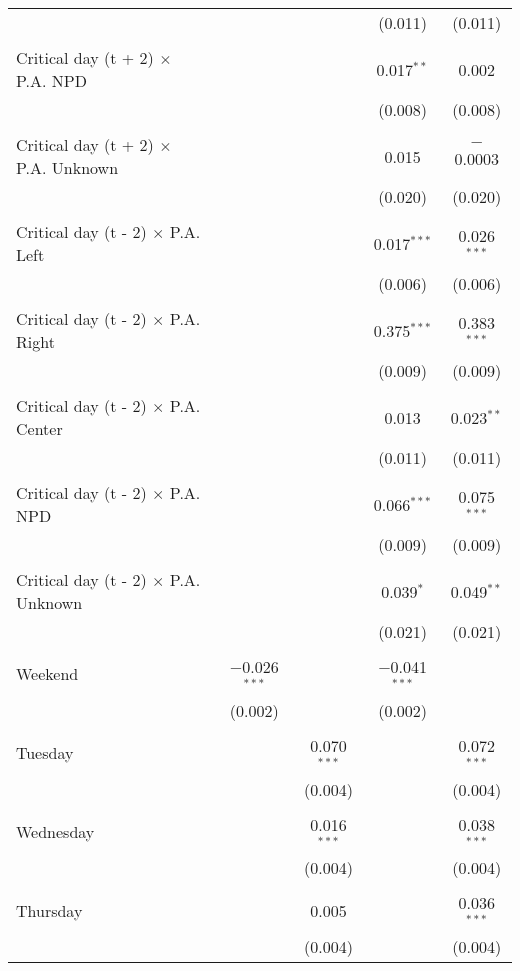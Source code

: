 \documentclass[
]{article}
\begin{document}
\begin{table}[!htbp]
{\begin{tabular}{@{\extracolsep{5pt}}lcccc}
  &  &  & (0.011) & (0.011) \\ 
  & & & & \\ 
 Critical day (t + 2) $\times$ P.A. NPD &  &  & 0.017$^{**}$ & 0.002 \\ 
  &  &  & (0.008) & (0.008) \\ 
  & & & & \\ 
 Critical day (t + 2) $\times$ P.A. Unknown &  &  & 0.015 & $-$0.0003 \\ 
  &  &  & (0.020) & (0.020) \\ 
  & & & & \\ 
 Critical day (t - 2) $\times$ P.A. Left &  &  & 0.017$^{***}$ & 0.026$^{***}$ \\ 
  &  &  & (0.006) & (0.006) \\ 
  & & & & \\ 
 Critical day (t - 2) $\times$ P.A. Right &  &  & 0.375$^{***}$ & 0.383$^{***}$ \\ 
  &  &  & (0.009) & (0.009) \\ 
  & & & & \\ 
 Critical day (t - 2) $\times$ P.A. Center &  &  & 0.013 & 0.023$^{**}$ \\ 
  &  &  & (0.011) & (0.011) \\ 
  & & & & \\ 
 Critical day (t - 2) $\times$ P.A. NPD &  &  & 0.066$^{***}$ & 0.075$^{***}$ \\ 
  &  &  & (0.009) & (0.009) \\ 
  & & & & \\ 
 Critical day (t - 2) $\times$ P.A. Unknown &  &  & 0.039$^{*}$ & 0.049$^{**}$ \\ 
  &  &  & (0.021) & (0.021) \\ 
  & & & & \\ 
 Weekend & $-$0.026$^{***}$ &  & $-$0.041$^{***}$ &  \\ 
  & (0.002) &  & (0.002) &  \\ 
  & & & & \\ 
 Tuesday &  & 0.070$^{***}$ &  & 0.072$^{***}$ \\ 
  &  & (0.004) &  & (0.004) \\ 
  & & & & \\ 
 Wednesday &  & 0.016$^{***}$ &  & 0.038$^{***}$ \\ 
  &  & (0.004) &  & (0.004) \\ 
  & & & & \\ 
 Thursday &  & 0.005 &  & 0.036$^{***}$ \\ 
  &  & (0.004) &  & (0.004) \\ 

\end{tabular}}
\end{table}
\end{document}
